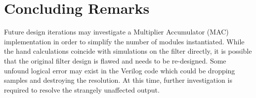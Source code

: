 \section*{Concluding Remarks}
Future design iterations may investigate a Multiplier Accumulator (MAC) implementation in order to simplify the number of modules instantiated. While the hand calculations coincide with simulations on the filter directly, it is possible that the original filter design is flawed and needs to be re-designed. Some unfound logical error may exist in the Verilog code which could be dropping samples and destroying the resolution. At this time, further investigation is required to resolve the strangely unaffected output. 